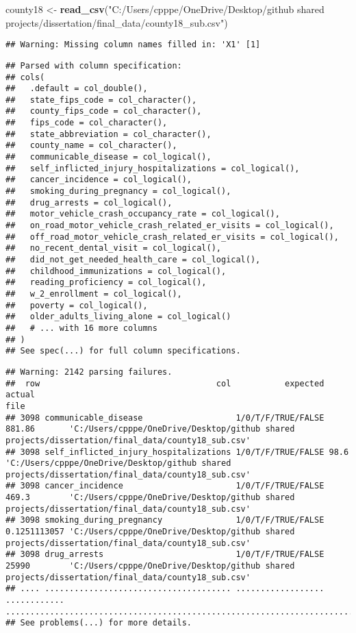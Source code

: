 \documentclass[
]{article}
\newenvironment{Shaded}{\begin{snugshade}}{\end{snugshade}}
\newcommand{\KeywordTok}[1]{\textcolor[rgb]{0.13,0.29,0.53}{\textbf{#1}}}
\newcommand{\NormalTok}[1]{#1}
\newcommand{\StringTok}[1]{\textcolor[rgb]{0.31,0.60,0.02}{#1}}
\begin{document}
\begin{Shaded}
\begin{Highlighting}[]
\NormalTok{county18 <-}\StringTok{ }\KeywordTok{read_csv}\NormalTok{(}\StringTok{"C:/Users/cpppe/OneDrive/Desktop/github shared projects/dissertation/final_data/county18_sub.csv"}\NormalTok{)}
\end{Highlighting}
\end{Shaded}

\begin{verbatim}
## Warning: Missing column names filled in: 'X1' [1]
\end{verbatim}

\begin{verbatim}
## Parsed with column specification:
## cols(
##   .default = col_double(),
##   state_fips_code = col_character(),
##   county_fips_code = col_character(),
##   fips_code = col_character(),
##   state_abbreviation = col_character(),
##   county_name = col_character(),
##   communicable_disease = col_logical(),
##   self_inflicted_injury_hospitalizations = col_logical(),
##   cancer_incidence = col_logical(),
##   smoking_during_pregnancy = col_logical(),
##   drug_arrests = col_logical(),
##   motor_vehicle_crash_occupancy_rate = col_logical(),
##   on_road_motor_vehicle_crash_related_er_visits = col_logical(),
##   off_road_motor_vehicle_crash_related_er_visits = col_logical(),
##   no_recent_dental_visit = col_logical(),
##   did_not_get_needed_health_care = col_logical(),
##   childhood_immunizations = col_logical(),
##   reading_proficiency = col_logical(),
##   w_2_enrollment = col_logical(),
##   poverty = col_logical(),
##   older_adults_living_alone = col_logical()
##   # ... with 16 more columns
## )
## See spec(...) for full column specifications.
\end{verbatim}

\begin{verbatim}
## Warning: 2142 parsing failures.
##  row                                    col           expected       actual                                                                                              file
## 3098 communicable_disease                   1/0/T/F/TRUE/FALSE 881.86       'C:/Users/cpppe/OneDrive/Desktop/github shared projects/dissertation/final_data/county18_sub.csv'
## 3098 self_inflicted_injury_hospitalizations 1/0/T/F/TRUE/FALSE 98.6         'C:/Users/cpppe/OneDrive/Desktop/github shared projects/dissertation/final_data/county18_sub.csv'
## 3098 cancer_incidence                       1/0/T/F/TRUE/FALSE 469.3        'C:/Users/cpppe/OneDrive/Desktop/github shared projects/dissertation/final_data/county18_sub.csv'
## 3098 smoking_during_pregnancy               1/0/T/F/TRUE/FALSE 0.1251113057 'C:/Users/cpppe/OneDrive/Desktop/github shared projects/dissertation/final_data/county18_sub.csv'
## 3098 drug_arrests                           1/0/T/F/TRUE/FALSE 25990        'C:/Users/cpppe/OneDrive/Desktop/github shared projects/dissertation/final_data/county18_sub.csv'
## .... ...................................... .................. ............ .................................................................................................
## See problems(...) for more details.
\end{verbatim}
\end{document}
